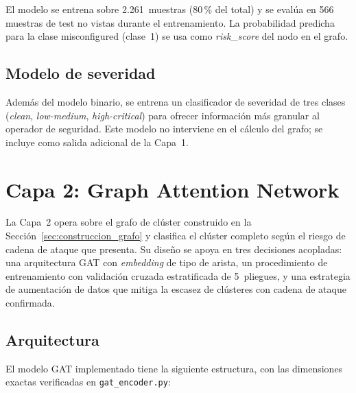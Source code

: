 El modelo se entrena sobre 2.261~muestras (80\,\% del total) y se evalúa en 566
muestras de test no vistas durante el entrenamiento. La probabilidad predicha para la
clase misconfigured (clase~1) se usa como \textit{risk\_score} del nodo en el grafo.

\subsection{Modelo de severidad}

Además del modelo binario, se entrena un clasificador de severidad de tres clases
(\textit{clean}, \textit{low-medium}, \textit{high-critical}) para ofrecer información
más granular al operador de seguridad. Este modelo no interviene en el cálculo del
grafo; se incluye como salida adicional de la Capa~1.

\section{Capa 2: Graph Attention Network}
\label{sec:capa2_diseno}

La Capa~2 opera sobre el grafo de clúster construido en la
Sección~\ref{sec:construccion_grafo} y clasifica el clúster completo según el
riesgo de cadena de ataque que presenta. Su diseño se apoya en tres decisiones
acopladas: una arquitectura \acs{GAT} con \textit{embedding} de tipo de arista, un
procedimiento de entrenamiento con validación cruzada estratificada de
5~pliegues, y una estrategia de aumentación de datos que mitiga la escasez de
clústeres con cadena de ataque confirmada.

\subsection{Arquitectura}

El modelo \ac{GAT} \citep{Velickovic2018} implementado tiene la siguiente estructura,
con las dimensiones exactas verificadas en \texttt{gat\_encoder.py}:

